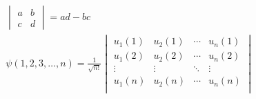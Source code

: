 \begin{align*}
&\begin{vmatrix}
a & b\\ 
c & d
\end{vmatrix}
=ad-bc\\
&\psi\left(1,2,3,\ldots,n\right)=\frac{1}{\sqrt{n!}}
\begin{vmatrix}
u_1(1) & u_2(1) & \cdots & u_n(1)\\ 
u_1(2) & u_2(2) & \cdots & u_n(2)\\ 
\vdots & \vdots & \ddots  & \vdots \\ 
u_1(n) & u_2(n) & \cdots & u_n(n)\\ 
\end{vmatrix}
\end{align*}